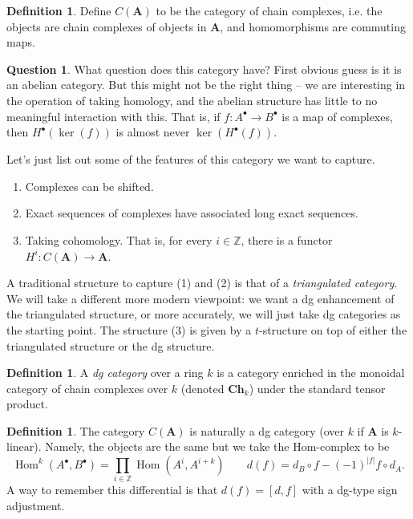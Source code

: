 \documentclass[10pt]{article}
\theoremstyle{definition}
\newtheorem{defn}[thm]{Definition}
\newtheorem{question}[thm]{Question}
\DeclareMathOperator{\Hom}{Hom}
\newcommand{\cat}{\mathbf}
\newcommand{\Z}{\mathbb{Z}}
\begin{document}
\begin{defn}
Define $C(\cat{A})$ to be the category of chain complexes, i.e. the objects are chain complexes of objects in $\cat{A}$, and homomorphisms are commuting maps.
\end{defn}

\begin{question}
What question does this category have?  First obvious guess is it is an abelian category.  But this might not be the right thing -- we are interesting in the operation of taking homology, and the abelian structure has little to no meaningful interaction with this.  That is, if $f: A^\bullet \rightarrow B^\bullet$ is a map of complexes, then $H^\bullet(\ker(f))$ is almost never $\ker(H^\bullet(f))$.
\end{question}

Let's just list out some of the features of this category we want to capture.
\begin{enumerate}
\item Complexes can be shifted.
\item Exact sequences of complexes have associated long exact sequences.
\item Taking cohomology.  That is, for every $i \in \Z$, there is a functor $H^i: C(\cat{A}) \rightarrow \cat{A}$.
\end{enumerate}

A traditional structure to capture (1) and (2) is that of a \emph{triangulated category}.  We will take a different more modern viewpoint: we want a dg enhancement of the triangulated structure, or more accurately, we will just take dg categories as the starting point.  The structure (3) is given by a $t$-structure on top of either the triangulated structure or the dg structure.

\begin{defn}
A \emph{dg category} over a ring $k$ is a category enriched in the monoidal category of chain complexes over $k$ (denoted $\cat{Ch}_k$) under the standard tensor product.
\end{defn}

\begin{defn}
The category $C(\cat{A})$ is naturally a dg category (over $k$ if $\cat{A}$ is $k$-linear).  Namely, the objects are the same but we take the Hom-complex to be
$$\Hom^k(A^\bullet, B^\bullet) = \prod_{i\in \Z} \Hom(A^i, A^{i+k}) \;\;\;\;\;\;\; d(f) = d_{B} \circ f - (-1)^{|f|} f \circ d_{A}.$$
A way to remember this differential is that $d(f) = [d, f]$ with a dg-type sign adjustment.
\end{defn}
\end{document}
